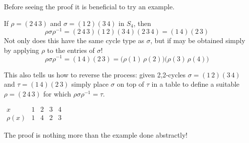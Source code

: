 Before seeing the proof it is beneficial to try an example.

\begin{example}{}{}
If $\rho=(2\,4\,3)$ and $\sigma=(1\,2)(3\,4)$ in $S_4$, then
  \[
  	\rho\sigma\rho^{-1}=(2\,4\,3)(1\,2)(3\,4)(2\,3\,4)=(1\,4)(2\,3)
  \]
  Not only does this have the same cycle type as $\sigma$, but if may be obtained simply by applying $\rho$ to the entries of $\sigma$!
  \[
  	\rho\sigma\rho^{-1}=(1\,4)(2\,3) 
  	=\bigl(\rho(1)\,\rho(2)\bigr)\bigl(\rho(3)\,\rho(4)\bigr)
  \]
  \begin{minipage}[t]{0.75\linewidth}\vspace{-5pt}
	  This also tells us how to reverse the process: given 2,2-cycles $\sigma=(1\,2)(3\,4)$ and $\tau=(1\,4)(2\,3)$ simply place $\sigma$ on top of $\tau$ in a table to define a suitable $\rho=(2\,4\,3)$ for which $\rho\sigma\rho^{-1}=\tau$.
	  \end{minipage}
	  \hfill
	  \begin{minipage}[t]{0.2\linewidth}\vspace{-5pt}
	    $\begin{array}{l|cccc}
	  		x&1&2&3&4\\\hline
	  		\rho(x)&1&4&2&3
	  	\end{array}$
  \end{minipage}
\end{example}

The proof is nothing more than the example done abstractly!

